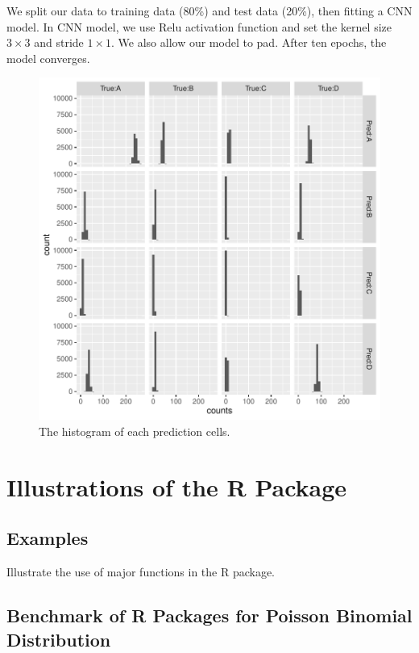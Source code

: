 \documentclass[12pt]{article}
\begin{document}
We split our data to training data (80\%) and test data (20\%), then fitting a CNN model. In CNN model, we use Relu activation function and set the kernel size $3 \times 3$ and stride $1 \times 1$. We also allow our model to pad. After ten epochs, the model converges.

\begin{figure}
	\centering
	\includegraphics[scale=1.0]{figures/ConfusionHistogram.pdf}
	\caption{The histogram of each prediction cells.}
\end{figure}
\section{Illustrations of the R Package}
\subsection{Examples}
Illustrate the use of major functions in the R package.


\subsection{Benchmark of R Packages for Poisson Binomial Distribution}
\end{document}
